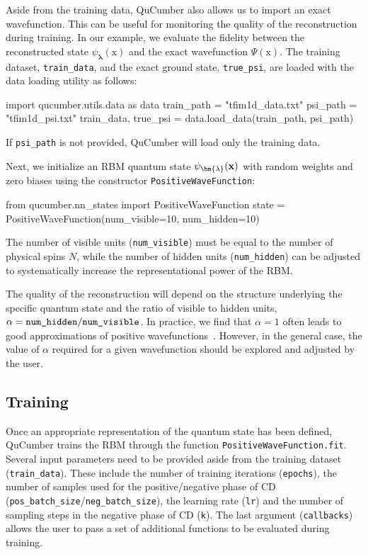 \documentclass[submission, Phys, hidelnks]{SciPost}
\newcommand{\x}{\bm{\mathrm{x}}}
\begin{document}
Aside from the training data, QuCumber also allows us to import an exact
wavefunction. This can be useful for monitoring the quality of the
reconstruction during training. In our example, we evaluate the fidelity between
the reconstructed state $\psi_{\bm{\lambda}}(\x)$ and the exact wavefunction
$\Psi(\x)$. The training dataset, \verb|train_data|, and the exact ground
state, \verb|true_psi|, are loaded with the data loading utility as follows:
\begin{python}
import qucumber.utils.data as data
train_path = "tfim1d_data.txt"
psi_path = "tfim1d_psi.txt"
train_data, true_psi = data.load_data(train_path, psi_path)
\end{python}
If \verb|psi_path| is not provided, QuCumber will load only the training data.

Next, we initialize an RBM quantum state $\psi_{\bm{\lambda}}(\bf{x})$ with
random weights and zero biases using the constructor \verb|PositiveWaveFunction|:
\begin{python}
from qucumber.nn_states import PositiveWaveFunction
state = PositiveWaveFunction(num_visible=10, num_hidden=10)
\end{python}
The number of visible units (\verb|num_visible|) must be equal to the number
of physical spins $N$, while the number of hidden units (\verb|num_hidden|) can
 be adjusted to systematically increase the representational power of the RBM.\@

The quality of the reconstruction will depend on the structure underlying the
specific quantum state and the ratio of visible to hidden units,
$\alpha = \verb|num_hidden|/\verb|num_visible|$.
In practice, we find that $\alpha = 1$ often leads to good
approximations of positive wavefunctions~\cite{torlai_neural-network_2018}.
However, in the general case, the value of $\alpha$ required for a given
wavefunction should be explored and adjusted by the user.


\subsection{Training}
Once an appropriate representation of the quantum state has been defined,
QuCumber trains the RBM through the function \verb|PositiveWaveFunction.fit|.
Several input parameters need to be provided aside from the training dataset
(\verb|train_data|). These include the number of training iterations
(\verb|epochs|), the number of samples used for the positive/negative phase of
CD (\verb|pos_batch_size|/\verb|neg_batch_size|), the learning rate (\verb|lr|)
and the number of sampling steps in the negative phase of CD (\verb|k|). The
last argument (\verb|callbacks|) allows the user to pass a set of additional
functions to be evaluated during training.
\end{document}

